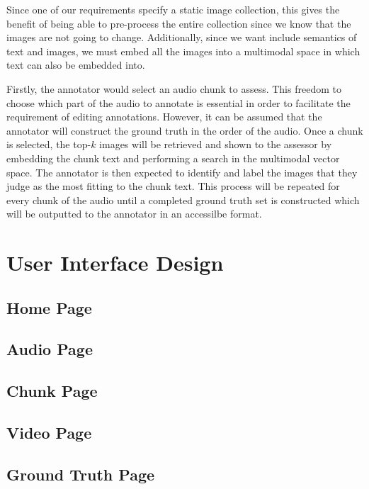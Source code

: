 \documentclass{l4proj}
\begin{document}
Since one of our requirements specify a static image collection, this gives the benefit of being able to pre-process the entire collection since we know that the images are not going to change. Additionally, since we want include semantics of text and images, we must embed all the images into a multimodal space in which text can also be embedded into.

Firstly, the annotator would select an audio chunk to assess. This freedom to choose which part of the audio to annotate is essential in order to facilitate the requirement of editing annotations. However, it can be assumed that the annotator will construct the ground truth in the order of the audio. Once a chunk is selected, the top-$k$ images will be retrieved and shown to the assessor by embedding the chunk text and performing a search in the multimodal vector space. The annotator is then expected to identify and label the images that they judge as the most fitting to the chunk text. This process will be repeated for every chunk of the audio until a completed ground truth set is constructed which will be outputted to the annotator in an accessilbe format.


\section{User Interface Design}

\subsection{Home Page}

\subsection{Audio Page}

\subsection{Chunk Page}

\subsection{Video Page}

\subsection{Ground Truth Page}
\end{document}
